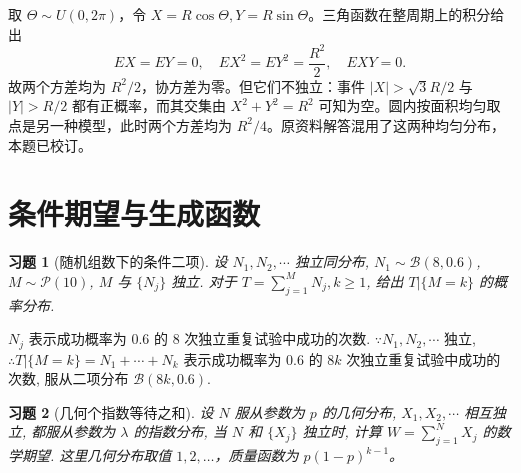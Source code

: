 \documentclass[UTF8,12pt,a4paper,fontset=fandol]{ctexart}
\newtheorem{exercise}{习题}[section]
\begin{document}
\begin{solve}\label{a:A5.35}取 $\Theta\sim U(0,2\pi)$，令 $X=R\cos\Theta,Y=R\sin\Theta$。三角函数在整周期上的积分给出\[EX=EY=0,\quad EX^2=EY^2=\frac{R^2}{2},\quad EXY=0.\]故两个方差均为 $R^2/2$，协方差为零。但它们不独立：事件 $|X|>\sqrt3R/2$ 与 $|Y|>R/2$ 都有正概率，而其交集由 $X^2+Y^2=R^2$ 可知为空。圆内按面积均匀取点是另一种模型，此时两个方差均为 $R^2/4$。原资料解答混用了这两种均匀分布，本题已校订。\end{solve}

\clearpage\section{条件期望与生成函数}

\begin{exercise}[随机组数下的条件二项]\label{q:A6.1}
设 $N_1,N_2,\cdots$ 独立同分布, $N_1\sim\mathcal{B}(8,0.6)$, $M\sim\mathcal{P}(10)$, $M$ 与 $\{N_j\}$ 独立. 对于 $T=\sum\limits_{j=1}^MN_j,k\geq1$, 给出 $T|\{M=k\}$ 的概率分布.\par{}
\end{exercise}

\begin{solve}\label{a:A6.1}
    $N_j$ 表示成功概率为 $0.6$ 的 $8$ 次独立重复试验中成功的次数. $\because N_1,N_2,\cdots$ 独立, $\therefore T|\{M=k\}=N_1+\cdots+N_k$ 表示成功概率为 $0.6$ 的 $8k$ 次独立重复试验中成功的次数, 服从二项分布 $\mathcal{B}(8k,0.6)$.
\end{solve}

\begin{exercise}[几何个指数等待之和]\label{q:A6.3}
设 $N$ 服从参数为 $p$ 的几何分布, $X_1,X_2,\cdots$ 相互独立, 都服从参数为 $\lambda$ 的指数分布, 当 $N$ 和 $\{X_j\}$ 独立时, 计算 $W=\sum\limits_{j=1}^NX_j$ 的数学期望. 这里几何分布取值 $1,2,\ldots$，质量函数为 $p(1-p)^{k-1}$。\par{}
\end{exercise}
\end{document}
